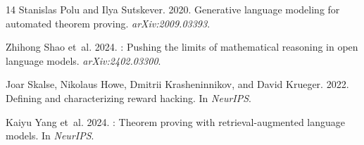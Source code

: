 \documentclass[11pt,a4paper]{article}
\begin{document}
\begin{thebibliography}{14}
Stanislas Polu and Ilya Sutskever. 2020.
\newblock Generative language modeling for automated theorem proving.
\newblock \emph{arXiv:2009.03393}.

Zhihong Shao et~al. 2024.
: Pushing the limits of mathematical reasoning in open language models.
\newblock \emph{arXiv:2402.03300}.

Joar Skalse, Nikolaus Howe, Dmitrii Krasheninnikov, and David Krueger. 2022.
\newblock Defining and characterizing reward hacking.
\newblock In \emph{NeurIPS}.

Kaiyu Yang et~al. 2024.
: Theorem proving with retrieval-augmented language models.
\newblock In \emph{NeurIPS}.

\end{thebibliography}
\end{document}
